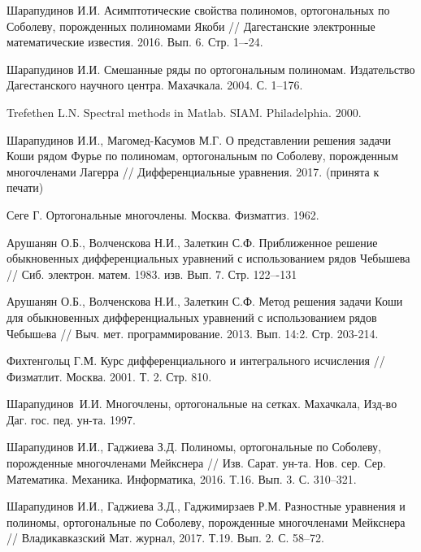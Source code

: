 \begin{thebibliography}{111}
{Шарапудинов И.И.}
Асимптотические свойства полиномов, ортогональных по Соболеву, порожденных полиномами Якоби // Дагестанские электронные математические известия. 2016. Вып. 6.	Стр. 1–-24.


{Шарапудинов И.И.}
Смешанные ряды по ортогональным полиномам. Издательство Дагестанского научного центра. Махачкала. 2004. С. 1--176.


{Trefethen L.N.}
Spectral methods in Matlab. SIAM. Philadelphia. 2000.


{Шарапудинов И.И., Магомед-Касумов М.Г.}
О представлении решения задачи Коши  рядом Фурье  по полиномам, ортогональным по  Соболеву, порожденным многочленами Лагерра // Дифференциальные уравнения. 2017. (принята к печати)








Сеге Г. Ортогональные многочлены. Москва. Физматгиз. 1962.


{Арушанян О.Б., Волченскова Н.И., Залеткин С.Ф.}
Приближенное решение обыкновенных дифференциальных уравнений с использованием рядов Чебышева // Сиб. электрон. матем. 1983. изв. Вып. 7. Стр. 122–-131


{Арушанян О.Б., Волченскова Н.И., Залеткин С.Ф.}
 Метод решения задачи Коши для обыкновенных дифференциальных уравнений с использованием рядов Чебышeва // Выч. мет. программирование. 2013. Вып. 14:2. Стр. 203-214.


{Фихтенгольц Г.М.}
Курс дифференциального и интегрального исчисления // Физматлит. Москва. 2001. Т. 2. Стр. 810.


{Шарапудинов~И.И.} Многочлены, ортогональные на сетках. Махачкала, Изд-во Даг. гос. пед. ун-та. 1997.		


{Шарапудинов И.И., Гаджиева З.Д.}
Полиномы, ортогональные по Соболеву, порожденные многочленами Мейкснера // Изв. Сарат. ун-та. Нов. сер. Сер. Математика. Механика. Информатика,
2016. Т.16. Вып. 3. С. 310--321.


{Шарапудинов И.И., Гаджиева З.Д., Гаджимирзаев Р.М.}
Разностные уравнения и полиномы, ортогональные по Соболеву, порожденные многочленами Мейкснера //
Владикавказский Мат. журнал, 2017. Т.19. Вып. 2. С. 58--72.



\end{thebibliography}
